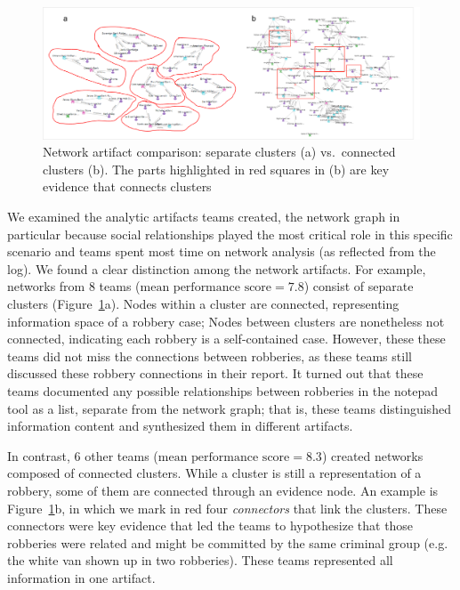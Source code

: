 \begin{figure}
\centering
\includegraphics[width=\columnwidth]{img/network_cluster.png}
\caption{Network artifact comparison: separate clusters (a)
vs.~connected clusters (b). The parts highlighted in red squares in (b) are key
evidence that connects clusters\label{fig:network_cluster}}
\end{figure}

We examined the analytic artifacts teams created, the network
graph in particular because social relationships played the most
critical role in this specific scenario and teams spent most time on
network analysis (as reflected from the log). We found a clear distinction among the network artifacts. For example, networks from
8 teams ($\text{mean performance score}=7.8$) consist of separate clusters
(Figure~\ref{fig:network_cluster}a). Nodes within a cluster are
connected, representing information space of a robbery case; Nodes
between clusters are nonetheless not connected, indicating each robbery
is a self-contained case. However, these these teams did not miss the connections between robberies, as these teams still discussed these robbery connections in their report.
It turned out that these teams documented any possible relationships between
robberies in the notepad tool as a list, separate from the network graph; that is, these teams distinguished information content and synthesized them in different artifacts.

In contrast, 6 other teams ($\text{mean performance score}=8.3$) created networks
composed of connected clusters. While a cluster is still a
representation of a robbery, some of them are connected through an
evidence node. An example is Figure~\ref{fig:network_cluster}b, in
which we mark in red four \emph{connectors} that link the clusters. These
connectors were key evidence that led the teams to hypothesize that
those robberies were related and might be committed by the same criminal
group (e.g. the white van shown up in two robberies). These teams represented all information in one artifact.

